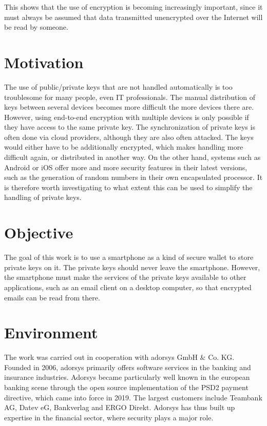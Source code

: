 \documentclass[12pt,oneside,a4paper,parskip]{scrbook}
\begin{document}
This shows that the use of encryption is becoming increasingly important, since it must always be assumed that data transmitted unencrypted over the Internet will be read by someone.

\section{Motivation}

The use of public/private keys that are not handled automatically is too troublesome for many people, even IT professionals. The manual distribution of keys between several devices becomes more difficult the more devices there are. However, using end-to-end encryption with multiple devices is only possible if they have access to the same private key. The synchronization of private keys is often done via cloud providers, although they are also often attacked. The keys would either have to be additionally encrypted, which makes handling more difficult again, or distributed in another way. On the other hand, systems such as Android or iOS offer more and more security features in their latest versions, such as the generation of random numbers in their own encapsulated processor. It is therefore worth investigating to what extent this can be used to simplify the handling of private keys.

\section{Objective}

The goal of this work is to use a smartphone as a kind of secure wallet to store private keys on it. The private keys should never leave the smartphone. However, the smartphone must make the services of the private keys available to other applications, such as an email client on a desktop computer, so that encrypted emails can be read from there.

\section{Environment}

The work was carried out in cooperation with adorsys GmbH \& Co. KG. Founded in 2006, adorsys primarily offers software services in the banking and insurance industries. Adorsys became particularly well known in the european banking scene through the open source implementation of the PSD2 payment directive, which came into force in 2019. The largest customers include Teambank AG, Datev eG, Bankverlag and ERGO Direkt. Adorsys has thus built up expertise in the financial sector, where security plays a major role. 
\end{document}
